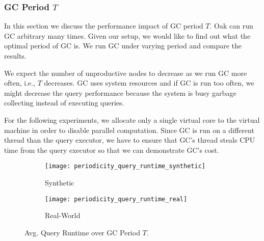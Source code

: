 \documentclass[abstracton,12pt]{scrartcl}
\theoremstyle{definition}
\begin{document}
\subsubsection{GC Period $T$}

\label{sec:periodicity}

In this section we discuss the performance impact of GC period $T$. Oak can run
GC arbitrary many times. Given our setup, we would like to find out what the
optimal period of GC is. We run GC under varying period and compare
the results.

We expect the number of unproductive nodes to decrease as we run GC more often,
i.e., $T$ decreases. GC uses system resources and if GC is run too often,
we might decrease the query performance because the system is busy garbage
collecting instead of executing queries.

For the following experiments, we allocate only a single virtual core to the
virtual machine in order to disable parallel computation. Since GC is run
on a different thread than the query executor, we have to ensure that GC's
thread steals CPU time from the query executor so that we can demonstrate
GC's cost.

\begin{figure}[ht]
  \centering
  \begin{subfigure}{0.49\linewidth}
    \centering
    \caption{Synthetic}
    \texttt{[image: periodicity\_query\_runtime\_synthetic]}
    \label{fig:period_runtime_synthetic}
  \end{subfigure}
  \begin{subfigure}{0.49\linewidth}
    \centering
    \caption{Real-World}
    \texttt{[image: periodicity\_query\_runtime\_real]}
    \label{fig:period_runtime_real}
  \end{subfigure}
  \vspace{-0.5cm}
  \caption{Avg. Query Runtime over GC Period $T$.}
\end{figure}

\end{document}
